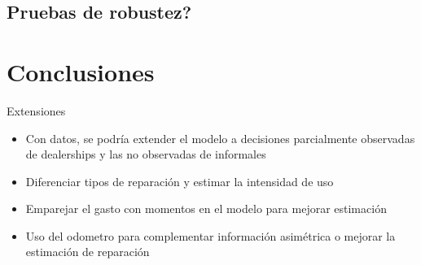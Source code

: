 \documentclass{article}
\begin{document}
\subsection{Pruebas de robustez?}


\section{Conclusiones}


Extensiones
\begin{itemize}
    \item Con datos, se podría extender el modelo a decisiones parcialmente observadas de dealerships y las no observadas de informales
    \item Diferenciar tipos de reparación y estimar la intensidad de uso
    \item Emparejar el gasto con momentos en el modelo para mejorar estimación
    \item Uso del odometro para complementar información asimétrica o mejorar la estimación de reparación
\end{itemize}




\printbibliography[title={Referencias}]
\end{document}
